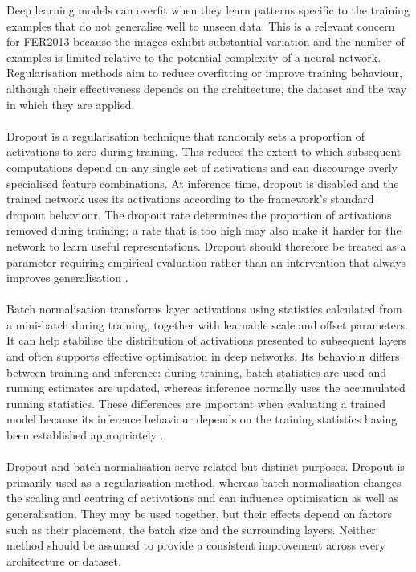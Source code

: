 \documentclass[12pt, a4paper]{report}
\begin{document}
				Deep learning models can overfit when they learn patterns specific to the training examples that do not generalise well to unseen data. This is a relevant concern for FER2013 because the images exhibit substantial variation and the number of examples is limited relative to the potential complexity of a neural network. Regularisation methods aim to reduce overfitting or improve training behaviour, although their effectiveness depends on the architecture, the dataset and the way in which they are applied.\\\\
				Dropout is a regularisation technique that randomly sets a proportion of activations to zero during training. This reduces the extent to which subsequent computations depend on any single set of activations and can discourage overly specialised feature combinations. At inference time, dropout is disabled and the trained network uses its activations according to the framework's standard dropout behaviour. The dropout rate determines the proportion of activations removed during training; a rate that is too high may also make it harder for the network to learn useful representations. Dropout should therefore be treated as a parameter requiring empirical evaluation rather than an intervention that always improves generalisation \cite{srivastava2014dropout}.\\\\
				Batch normalisation transforms layer activations using statistics calculated from a mini-batch during training, together with learnable scale and offset parameters. It can help stabilise the distribution of activations presented to subsequent layers and often supports effective optimisation in deep networks. Its behaviour differs between training and inference: during training, batch statistics are used and running estimates are updated, whereas inference normally uses the accumulated running statistics. These differences are important when evaluating a trained model because its inference behaviour depends on the training statistics having been established appropriately \cite{ioffe2015batch}.\\\\
				Dropout and batch normalisation serve related but distinct purposes. Dropout is primarily used as a regularisation method, whereas batch normalisation changes the scaling and centring of activations and can influence optimisation as well as generalisation. They may be used together, but their effects depend on factors such as their placement, the batch size and the surrounding layers. Neither method should be assumed to provide a consistent improvement across every architecture or dataset.\\\\
\end{document}
